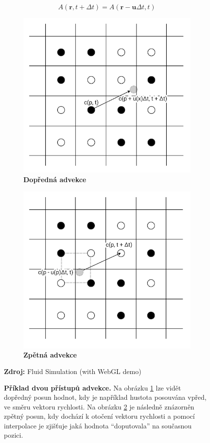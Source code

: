 \begin{equation}
	A(\mathbf{r}, t + \Delta t) = A(\mathbf{r} - \mathbf{u}\Delta t, t)
	\label{eq:backAdvection}
\end{equation}

\begin{figure}[h]
	\centering
	\captionsetup{justification=centering}
	\begin{subfigure}{.5\textwidth}
		\centering
		\includegraphics[width=0.5\linewidth]{obrazky-figures/advection1.png}
		\caption{\textbf{Dopředná advekce}}
		\label{fig:fwbAdvection}
	\end{subfigure}%
	\begin{subfigure}{.5\textwidth}
		\centering
		\includegraphics[width=0.5\linewidth]{obrazky-figures/advection2.png}
		\caption{\textbf{Zpětná advekce}}
		\label{fig:backAdvection}
	\end{subfigure}
	\caption{\textbf{Příklad dvou přístupů advekce.} Na obrázku \ref{fig:fwbAdvection} lze vidět dopředný posun hodnot, kdy je například hustota posouvána vpřed, ve směru vektoru rychlosti. Na obrázku \ref{fig:backAdvection} je následně znázorněn zpětný posun, kdy dochází k otočení vektoru rychlosti a pomocí interpolace je zjišťuje jaká hodnota \enquote{doputovala} na současnou pozici.}
	\textbf{Zdroj:} Fluid Simulation (with WebGL demo) \cite{webglFluid}
	\label{fig:advection}
\end{figure}

